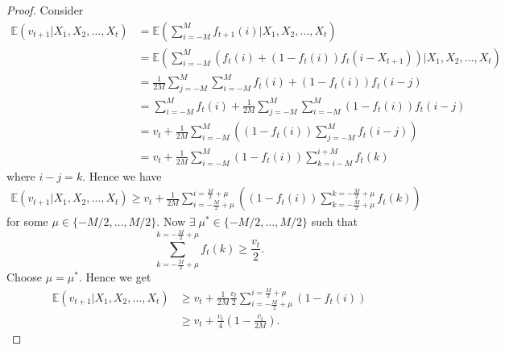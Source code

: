 \documentclass{article}
\begin{document}
\begin{proof}
Consider
\begin{align*}
    \mathbb{E}(v_{t+1}|X_1,X_2,\dots,X_t) &= \mathbb{E}\left(\sum_{i=-M}^M f_{t+1}(i)|X_1,X_2,\dots,X_t\right)\\
    &= \mathbb{E}\left(\sum_{i=-M}^M (f_{t}(i)+(1-f_t(i))f_t(i-X_{t+1}))|X_1,X_2,\dots,X_t\right)\\
    &= \frac{1}{2M}\sum_{j=-M}^M \sum_{i=-M}^M f_t(i)+(1-f_t(i))f_t(i-j)\\
    &= \sum_{i=-M}^M f_t(i)+\frac{1}{2M}\sum_{j=-M}^M \sum_{i=-M}^M (1-f_t(i))f_t(i-j)\\
    &= v_t+\frac{1}{2M} \sum_{i=-M}^M \left((1-f_t(i))\sum_{j=-M}^M f_t(i-j)\right)\\
    &= v_t+\frac{1}{2M} \sum_{i=-M}^M (1-f_t(i))\sum_{k=i-M}^{i+M}f_t(k)
    \end{align*}
where $i-j=k$. Hence we have
    \begin{align*}    
    \mathbb{E}(v_{t+1}|X_1,X_2,\dots,X_t) \geq v_t + \frac{1}{2M}\sum_{i=-\frac{M}{2}+\mu}^{i=\frac{M}{2}+\mu}\left((1-f_t(i))\sum_{k=-\frac{M}{2}+\mu}^{k=-\frac{M}{2}+\mu}f_t(k)\right)
\end{align*}
for some $\mu\in \{-M/2,\dots,M/2\}$. Now $\exists\; \mu^*\in \{-M/2,\dots,M/2\}$ such that
\begin{equation*}
    \sum_{k=-\frac{M}{2}+\mu}^{k=-\frac{M}{2}+\mu}f_t(k)\geq \frac{v_t}{2}.
\end{equation*}
Choose $\mu=\mu^*$. Hence we get
\begin{align*}
    \mathbb{E}(v_{t+1}|X_1,X_2,\dots,X_t) &\geq v_t + \frac{1}{2M}\frac{v_t}{2}\sum_{i=-\frac{M}{2}+\mu}^{i=\frac{M}{2}+\mu}\left(1-f_t(i)\right)\\
    &\geq v_t+\frac{v_t}{4}\left(1-\frac{v_t}{2M}\right).
\end{align*}
\end{proof}
\end{document}
